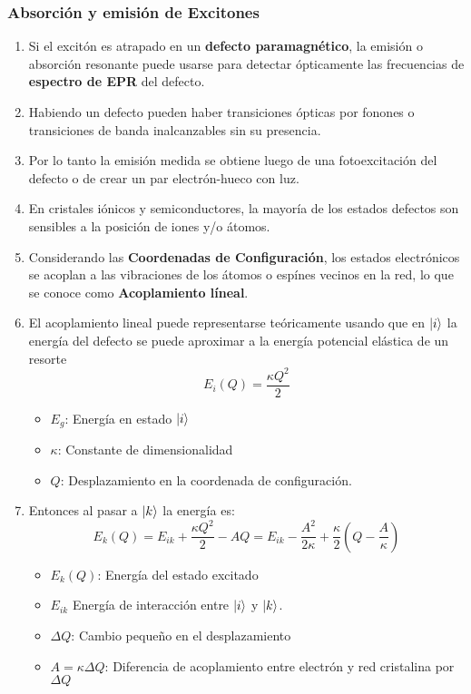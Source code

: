 \documentclass[aps,rmp,reprint,longbibliography]{revtex4-1}
\begin{document}
\subsubsection{Absorción y emisión de Excitones}
\begin{enumerate}
\item Si el excitón es atrapado en un \textbf{defecto paramagnético}, la emisión o absorción resonante puede usarse para detectar ópticamente las frecuencias de \textbf{espectro de EPR} del defecto.
\item Habiendo un defecto pueden haber transiciones ópticas por fonones o transiciones de banda inalcanzables sin su presencia.
\item Por lo tanto la emisión medida se obtiene luego de una fotoexcitación del defecto o de crear un par electrón-hueco con luz.
\item En cristales iónicos y semiconductores, la mayoría  de los estados defectos son sensibles a la posición de iones y/o átomos.
\item Considerando las \textbf{Coordenadas de Configuración}, los estados electrónicos se acoplan a las vibraciones de los átomos o espínes vecinos en la red, lo que se conoce como \textbf{Acoplamiento líneal}.
\item El acoplamiento lineal puede representarse teóricamente usando que en $\ket{i}$ la energía del defecto se puede aproximar a la energía potencial elástica de un resorte
\begin{equation}\label{eq15} E_i(Q)=\frac{\kappa Q^2}{2}\end{equation}
\begin{itemize}
    \item $E_g$: Energía en estado $\ket{i}$
    \item $\kappa$: Constante de dimensionalidad
    \item $Q$: Desplazamiento en la coordenada de configuración.
\end{itemize}
\item Entonces al pasar a $\ket{k}$ la energía es: 
\begin{equation}\label{eq16} E_k(Q)=E_{ik}+\frac{\kappa Q^2}{2}-AQ=E_{ik}-\frac{A^2}{2\kappa}+\frac{\kappa}{2}(Q-\frac{A}{\kappa})\end{equation}
\begin{itemize}
    \item $E_{k}(Q)$: Energía del estado excitado
    \item $E_{ik}$ Energía de interacción entre $\ket{i}$ y $\ket{k}$.
    \item $\Delta Q$: Cambio pequeño en el desplazamiento
    \item $A=\kappa\Delta Q$: Diferencia de acoplamiento entre electrón y red cristalina por $\Delta Q$
    

\end{itemize}
\end{enumerate}
\end{document}
